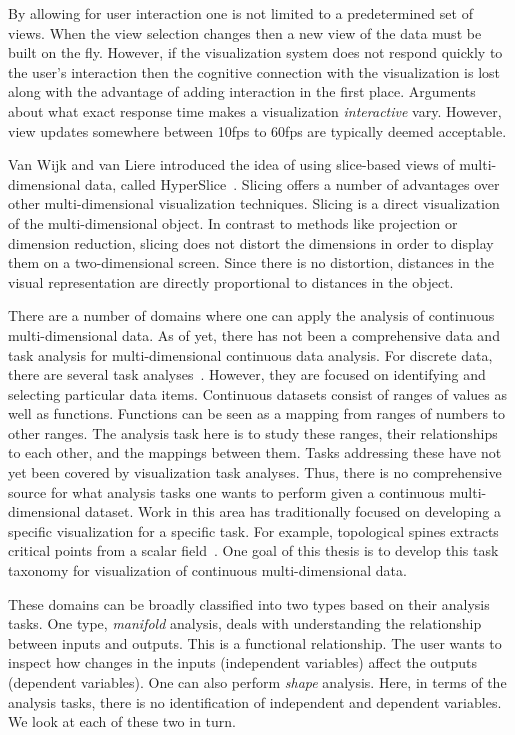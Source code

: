 By allowing for user interaction one is not limited to a
predetermined set of views.  
When the view selection changes then a new view of the data must be built
on the fly.
However, if the visualization system does not respond quickly to 
the user's interaction then the cognitive connection with the visualization
is lost~\cite{Shneiderman:1987} along with the advantage of adding 
interaction in the first place.
Arguments about what exact
response time makes a visualization \emph{interactive} vary.  However,
view updates somewhere between 10fps to 60fps are typically deemed acceptable.

Van Wijk and
van Liere introduced the idea of using slice-based views of multi-dimensional
data, called HyperSlice~\cite{Wijk:1993}.
Slicing offers a number of advantages over other multi-dimensional
visualization techniques. Slicing is a direct visualization of the
multi-dimensional object. In contrast to methods like projection or dimension
reduction, slicing does not distort the dimensions in order to display them on
a two-dimensional screen. Since there is no distortion, distances in the visual
representation are directly proportional to distances in the object. 

There are a number of domains where one can apply the analysis of continuous
multi-dimensional data.  As of yet, there has not been a comprehensive data and
task analysis for multi-dimensional continuous data analysis. For discrete
data, there are several task 
analyses~\cite{Shneiderman:1996,Brehmer:2013,Amar:2004}. 
However, they are
focused on identifying and selecting particular data items. Continuous datasets
consist of ranges of values as well as functions. Functions can be seen as a
mapping from ranges of numbers to other ranges. The analysis task here is to
study these ranges, their relationships to each other, and the mappings between
them. Tasks addressing these
have not yet been covered by visualization task analyses. Thus,
there is no comprehensive source for what analysis tasks one wants to perform
given a continuous multi-dimensional dataset.  Work in this area has
traditionally focused on developing a specific visualization for a specific
task. For example, topological spines extracts critical points from a scalar
field~\cite{Correa:2011}. One goal of this thesis is to develop this task
taxonomy for visualization of continuous multi-dimensional data.

These domains can be broadly classified into two types based on their analysis
tasks. One type, \emph{manifold} analysis, deals with understanding the
relationship between inputs and outputs. This is a functional relationship.
The user wants to inspect how changes in the inputs (independent variables)
affect the outputs (dependent variables). One can also perform \emph{shape}
analysis. Here, in terms of the analysis tasks, there is no identification of
independent and dependent variables. We look at each of these two in turn.

